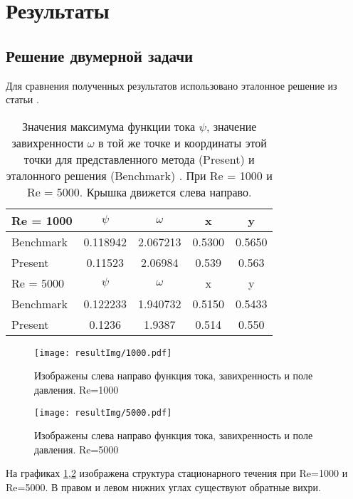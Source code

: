 \section{Результаты}
\subsection{Решение двумерной задачи}

Для сравнения полученных результатов использовано эталонное решение из статьи \cite{2DBench}. 

\begin{table}[htp]
\center
  \begin{tabular}{lcccc}
\hline
	Re = 1000 
		& $\psi$   	& $\omega$ 	& x 		& y \\
\hline	
	Benchmark 	& 0.118942 	& 2.067213 	& 0.5300   	& 0.5650 \\
	Present		& 0.11523	& 2.06984	& 0.539		& 0.563 \\
\hline 
\hline
	Re = 5000 
		& $\psi$   	& $\omega$ 	& x 		& y \\
\hline	
	Benchmark 	& 0.122233 	& 1.940732 	& 0.5150   	& 0.5433 \\
	Present		& 0.1236	& 1.9387	& 0.514		& 0.550 \\
\hline 
  \end{tabular}
\caption{Значения максимума функции тока $\psi$, значение завихренности $\omega$ в той же точке и координаты этой точки для представленного 
метода (Present) и эталонного решения (Benchmark) \cite{2DBench}. При Re = 1000 и Re = 5000. Крышка движется слева направо.}
\label{comp}
\end{table}



\begin{figure}[htp]
\centering
\texttt{[image: resultImg/1000.pdf]}
\caption{Изображены слева направо функция тока, завихренность и поле давления. Re=1000}
\label{Re1000}
\end{figure}

\begin{figure}[htp]
\centering
\texttt{[image: resultImg/5000.pdf]}
\caption{Изображены слева направо функция тока, завихренность и поле давления. Re=5000}
\label{Re5000}
\end{figure}

На графиках \ref{Re1000},\ref{Re5000} изображена структура стационарного течения при Re=1000 и Re=5000. В правом и левом нижних углах существуют обратные вихри.  

